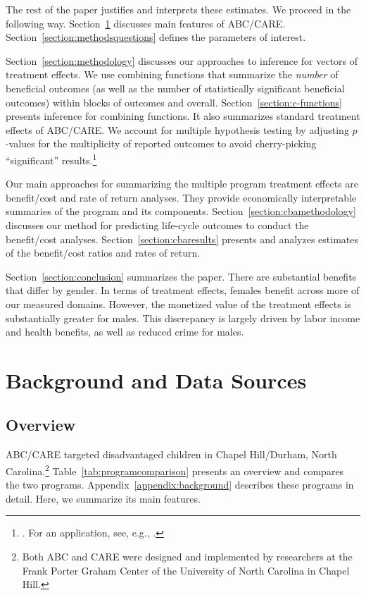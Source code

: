 The rest of the paper justifies and interprets these estimates. We proceed in the following way. Section~\ref{section:background} discusses main features of ABC/CARE. Section~\ref{section:methodsquestions} defines the parameters of interest.

Section~\ref{section:methodology} discusses our approaches to inference for vectors of treatment effects. We use  combining functions that summarize the \emph{number} of beneficial outcomes (as well as the number of statistically significant beneficial outcomes) within blocks of outcomes and overall. Section~\ref{section:c-functions} presents inference for combining functions. It also summarizes standard treatment effects of ABC/CARE. We account for multiple hypothesis testing by adjusting $p$-values for the multiplicity of reported outcomes to avoid cherry-picking ``significant'' results.\footnote{\citet{Lehman_Romano_2005_AnnStat,Romano_Shaikh_2006_AnnStat}. For an application, see, e.g., \cite{Heckman_Moon_etal_2010_QE}.}

Our main approaches for summarizing the multiple program treatment effects are benefit/cost and rate of return analyses. They provide economically interpretable summaries of the program and its components. Section~\ref{section:cbamethodology} discusses our method for predicting life-cycle outcomes to conduct the benefit/cost analyses. Section~\ref{section:cbaresults} presents and analyzes estimates of the benefit/cost ratios and rates of return.

Section~\ref{section:conclusion} summarizes the paper. There are substantial benefits that differ by gender. In terms of treatment effects, females benefit across more of our measured domains. However, the monetized value of the treatment effects is substantially greater for males. This discrepancy is largely driven by labor income and health benefits, as well as reduced crime for males.

\section[Background and Data Sources]{Background and Data Sources} \label{section:background}

\subsection{Overview}

ABC/CARE targeted disadvantaged children in Chapel Hill/Durham, North Carolina.\footnote{Both ABC and CARE were designed and implemented by researchers at the Frank Porter Graham Center of the University of North Carolina in Chapel Hill.} Table~\ref{tab:programcomparison} presents an overview and compares the two programs. Appendix~\ref{appendix:background} describes these programs in detail. Here, we summarize its main features.

